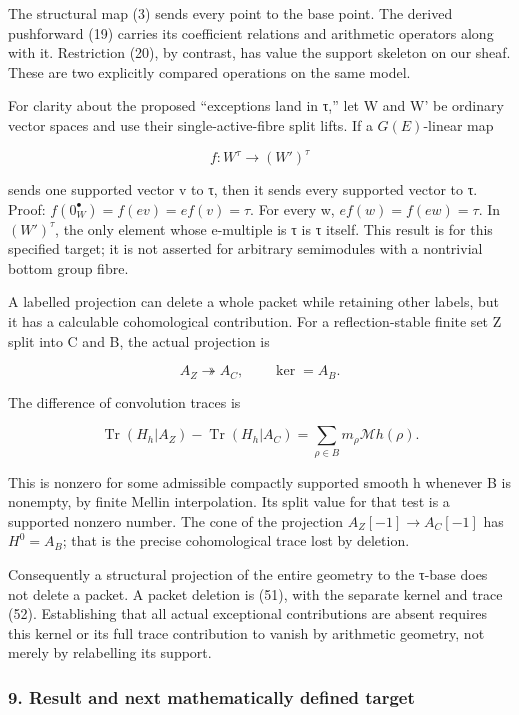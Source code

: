 The structural map (3) sends every point to the base point. The derived pushforward (19) carries its coefficient relations and arithmetic operators along with it. Restriction (20), by contrast, has value the support skeleton on our sheaf. These are two explicitly compared operations on the same model.

For clarity about the proposed ``exceptions land in τ,'' let W and W' be ordinary vector spaces and use their single-active-fibre split lifts. If a \(G(E)\)-linear map

\[
f:W^\tau\to(W')^\tau
\]

sends one supported vector v to τ, then it sends every supported vector to τ. Proof: \(f(0_W^\bullet)=f(ev)=ef(v)=\tau\). For every w, \(ef(w)=f(ew)=\tau\). In \((W')^\tau\), the only element whose e-multiple is τ is τ itself. This result is for this specified target; it is not asserted for arbitrary semimodules with a nontrivial bottom group fibre.

A labelled projection can delete a whole packet while retaining other labels, but it has a calculable cohomological contribution. For a reflection-stable finite set Z split into C and B, the actual projection is

\[
A_Z\twoheadrightarrow A_C,\qquad\ker=A_B.
\tag{51}
\]

The difference of convolution traces is

\[
\operatorname{Tr}(H_h|A_Z)-\operatorname{Tr}(H_h|A_C)
=\sum_{\rho\in B}m_\rho\mathcal Mh(\rho).
\tag{52}
\]

This is nonzero for some admissible compactly supported smooth h whenever B is nonempty, by finite Mellin interpolation. Its split value for that test is a supported nonzero number. The cone of the projection \(A_Z[-1]\to A_C[-1]\) has \(H^0=A_B\); that is the precise cohomological trace lost by deletion.

Consequently a structural projection of the entire geometry to the τ-base does not delete a packet. A packet deletion is (51), with the separate kernel and trace (52). Establishing that all actual exceptional contributions are absent requires this kernel or its full trace contribution to vanish by arithmetic geometry, not merely by relabelling its support.

\subsubsection{9. Result and next mathematically defined target}\label{endpoint-tau_base--result-and-next-mathematically-defined-target}

